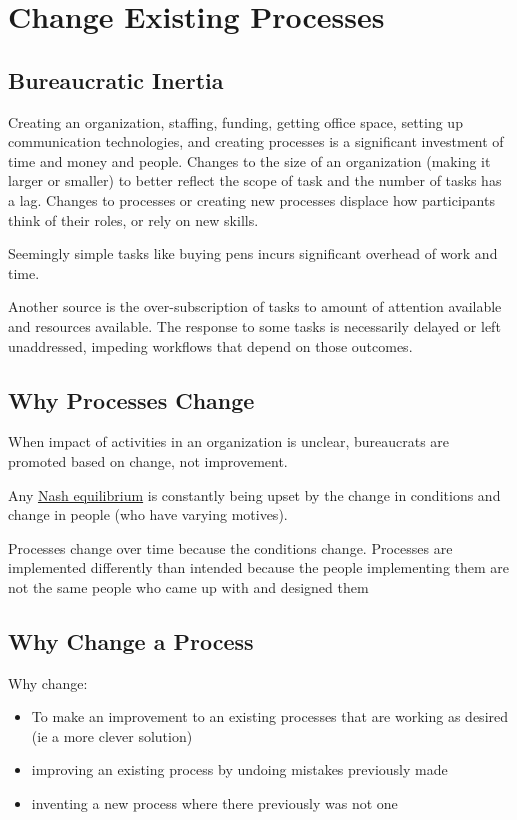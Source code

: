 \section{Change Existing Processes\label{sec:change-a-process}}

\subsection*{Bureaucratic Inertia}

Creating an organization, staffing, funding, getting office space, setting up communication technologies, and creating processes is a significant investment of time and money and people. Changes to the size of an organization (making it larger or smaller) to better reflect the scope of task and the number of tasks has a lag. Changes to processes or creating new processes displace how participants think of their roles, or rely on new skills. 

Seemingly simple tasks like buying pens incurs significant overhead of work and time. 

Another source is the over-subscription of tasks to amount of attention available and resources available. The response to some tasks is necessarily delayed or left unaddressed, impeding workflows that depend on those outcomes. 



\subsection*{Why Processes Change}


When impact of activities in an organization is unclear, bureaucrats are promoted based on change, not improvement.

Any \href{https://en.wikipedia.org/wiki/Nash_equilibrium}{Nash equilibrium} is constantly being upset by the change in conditions and change in people (who have varying motives).

Processes change over time because the conditions change. Processes are implemented differently than intended because the people implementing them are not the same people who came up with and designed them


\subsection*{Why Change a Process}
Why change:
\begin{itemize}
    \item To make an improvement to an existing processes that are working as desired (ie a more clever solution)
    \item improving an existing process by undoing mistakes previously made
    \item inventing a new process where there previously was not one
\end{itemize}

